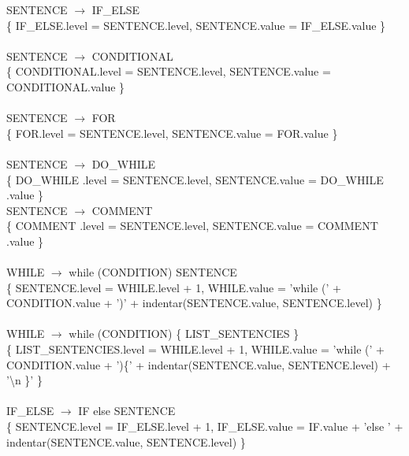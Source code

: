 \documentclass[10pt,a4paper]{article}
\begin{document}
SENTENCE $\rightarrow$  IF\_ELSE  \\ 

\{ IF\_ELSE.level = SENTENCE.level, SENTENCE.value = IF\_ELSE.value \}  \\ \\

SENTENCE $\rightarrow$  CONDITIONAL  \\ 

\{ CONDITIONAL.level = SENTENCE.level, SENTENCE.value = CONDITIONAL.value \}  \\ \\

SENTENCE $\rightarrow$  FOR \\ 

\{ FOR.level = SENTENCE.level, SENTENCE.value = FOR.value \}  \\ \\

SENTENCE $\rightarrow$  DO\_WHILE \\ 

\{ DO\_WHILE .level = SENTENCE.level, SENTENCE.value = DO\_WHILE .value \}  \\
  
SENTENCE $\rightarrow$  COMMENT \\ 

\{ COMMENT .level = SENTENCE.level, SENTENCE.value = COMMENT .value \}  \\ \\


WHILE $\rightarrow$ while (CONDITION) SENTENCE \\  

\{ SENTENCE.level = WHILE.level + 1, WHILE.value = 'while (' + CONDITION.value + ')' + indentar(SENTENCE.value, SENTENCE.level) \}  \\ \\

WHILE $\rightarrow$ while (CONDITION) \{ LIST\_SENTENCIES \}  \\

\{ LIST\_SENTENCIES.level = WHILE.level + 1, WHILE.value = 'while (' + CONDITION.value + ')\{' + indentar(SENTENCE.value, SENTENCE.level) + '\textbackslash{}n \}' \} \\ \\

IF\_ELSE $\rightarrow$ IF else SENTENCE   \\

\{ SENTENCE.level = IF\_ELSE.level + 1, IF\_ELSE.value = IF.value + 'else ' + indentar(SENTENCE.value, SENTENCE.level) \}  \\ \\
\end{document}
